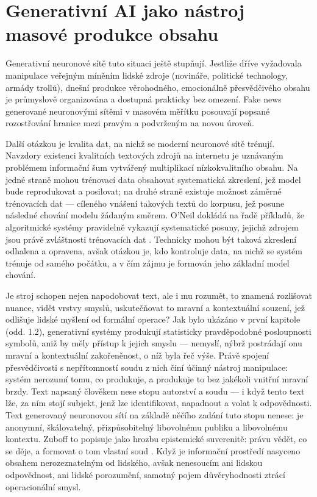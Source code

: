 \section{Generativní AI jako nástroj masové produkce obsahu}

Generativní neuronové sítě tuto situaci ještě stupňují.
Jestliže dříve vyžadovala manipulace veřejným míněním lidské zdroje (novináře, politické technology, armády trollů), dnešní produkce věrohodného, emocionálně přesvědčivého obsahu je průmyslově organizována a dostupná prakticky bez omezení. Fake news generované neuronovými sítěmi v masovém měřítku posouvají popsané rozostřování hranice mezi pravým a podvrženým na novou úroveň.

Další otázkou je kvalita dat, na nichž se moderní neuronové sítě trénují. Navzdory existenci kvalitních textových zdrojů na internetu je uznávaným problémem informační šum vytvářený multiplikací nízkokvalitního obsahu.
Na jedné straně mohou trénovací data obsahovat systematická zkreslení, jež model bude reprodukovat a posilovat; na druhé straně existuje možnost záměrné  trénovacích dat — cíleného vnášení takových textů do korpusu, jež posune následné chování modelu žádaným směrem.
O'Neil dokládá na řadě příkladů, že algoritmické systémy pravidelně vykazují systematické posuny, jejichž zdrojem jsou právě zvláštnosti trénovacích dat \parencite{ONeil16}.
Technicky mohou být taková zkreslení odhalena a opravena, avšak otázkou je, kdo kontroluje data, na nichž se systém trénuje od samého počátku, a v čím zájmu je formován jeho základní model chování.

Je stroj schopen nejen napodobovat text, ale i mu rozumět, to znamená rozlišovat nuance, vidět vrstvy smyslů, uskutečňovat to mravní a kontextuální souzení, jež odlišuje lidské myšlení od formální operace?
Jak bylo ukázáno v první kapitole (odd. 1.2), generativní systémy produkují statisticky pravděpodobné posloupnosti symbolů, aniž by měly přístup k jejich smyslu — nemyslí, nýbrž postrádají onu mravní a kontextuální zakořeněnost, o níž byla řeč výše.
Právě spojení přesvědčivosti s nepřítomností soudu z nich činí účinný nástroj manipulace: systém nerozumí tomu, co produkuje, a produkuje to bez jakékoli vnitřní mravní brzdy.
Text napsaný člověkem nese stopu autorství a soudu — i když tento text lže, za ním stojí subjekt, jenž lze identifikovat, napadnout a volat k odpovědnosti.
Text generovaný neuronovou sítí na základě něčího zadání tuto stopu nenese: je anonymní, škálovatelný, přizpůsobitelný libovolnému publiku a libovolnému kontextu.
Zuboff to popisuje jako hrozbu epistemické suverenitě: právu vědět, co se děje, a formovat o tom vlastní soud \parencite{Zuboff19}.
Když je informační prostředí nasyceno obsahem nerozeznatelným od lidského, avšak nenesoucím ani lidskou odpovědnost, ani lidské porozumění, samotný pojem důvěryhodnosti ztrácí operacionální smysl.

